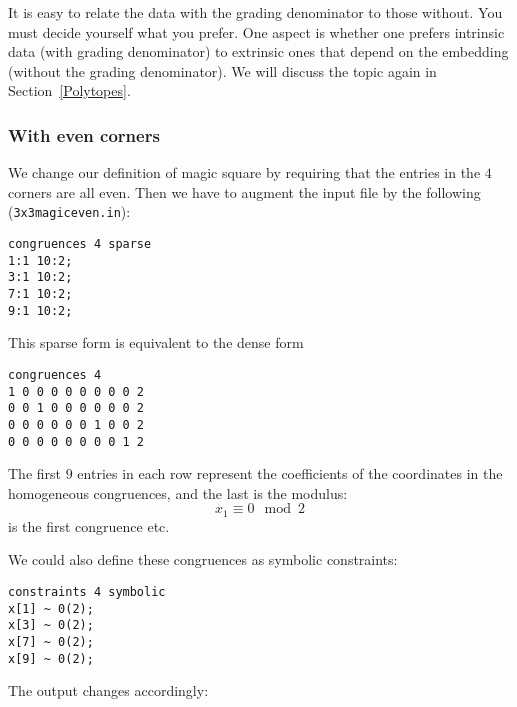 \documentclass[12pt,a4paper]{scrartcl}
\theoremstyle{definition}
\def\ttt{\texttt}
\begin{document}
It is easy to relate the data with the grading denominator to those without. You must decide yourself what you prefer. One aspect is whether one prefers intrinsic data (with grading denominator) to extrinsic ones that depend on the embedding (without the grading denominator). We will discuss the topic again in Section~\ref{Polytopes}.

\subsubsection{With even corners}\label{magiceven}\label{cong_ex}

We change our definition of magic square by requiring that the
entries in the $4$ corners are all even. Then we have to
augment the input file by the following (\ttt{3x3magiceven.in}):
\begin{Verbatim}
congruences 4 sparse
1:1 10:2;
3:1 10:2;
7:1 10:2;
9:1 10:2;
\end{Verbatim}
This sparse form is equivalent to the dense form
\begin{Verbatim}
congruences 4
1 0 0 0 0 0 0 0 0 2
0 0 1 0 0 0 0 0 0 2
0 0 0 0 0 0 1 0 0 2
0 0 0 0 0 0 0 0 1 2
\end{Verbatim}
The first $9$ entries in each row represent the coefficients of the coordinates in the homogeneous congruences, and the last is the modulus:
$$
x_1\equiv 0\mod 2
$$
is the first congruence etc.

We could also define these congruences as symbolic constraints:
\begin{Verbatim}
constraints 4 symbolic
x[1] ~ 0(2);
x[3] ~ 0(2);
x[7] ~ 0(2);
x[9] ~ 0(2);
\end{Verbatim}

The output changes accordingly:
\end{document}
